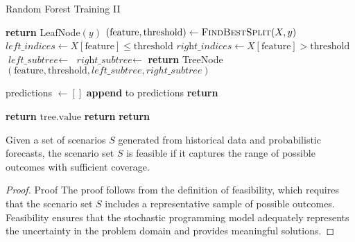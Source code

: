\documentclass[opre,sglanonrev]{informs4}
\begin{document}
\begin{algorithm}
\begin{algorithmic}[1]
\caption{Random Forest Training II}
        \State \textbf{return} LeafNode$(y)$
    \Else
        \State $(\text{feature}, \text{threshold}) \gets \textsc{FindBestSplit}(X, y)$
        \State $\textit{left\_indices} \gets X[\text{feature}] \leq \text{threshold}$
        \State $\textit{right\_indices} \gets X[\text{feature}] > \text{threshold}$
        \State $\textit{left\_subtree} \gets$ 
        \State $\textit{right\_subtree} \gets$ 
        \State \textbf{return} TreeNode$(\text{feature}, \text{threshold}, left\_subtree, right\_subtree)$
    \EndIf
\EndProcedure
\Statex

    \State predictions $\gets []$
        \State \textbf{append}  to predictions
    \EndFor
    \State \textbf{return} 
\EndProcedure
\Statex

        \State \textbf{return} $\text{tree.value}$
    \Else
            \State \textbf{return} 
        \Else
            \State \textbf{return} 
        \EndIf
    \EndIf
\EndProcedure
\end{algorithmic}
\end{algorithm}

\begin{lemma}\label{lem:FSS}
Given a set of scenarios $S$ generated from historical data and probabilistic forecasts, the scenario set $S$ is feasible if it captures the range of possible outcomes with sufficient coverage.
\end{lemma}

\begin{proof}{Proof}
The proof follows from the definition of feasibility, which requires that the scenario set $S$ includes a representative sample of possible outcomes. Feasibility ensures that the stochastic programming model adequately represents the uncertainty in the problem domain and provides meaningful solutions.\Halmos
\end{proof}
\end{document}
